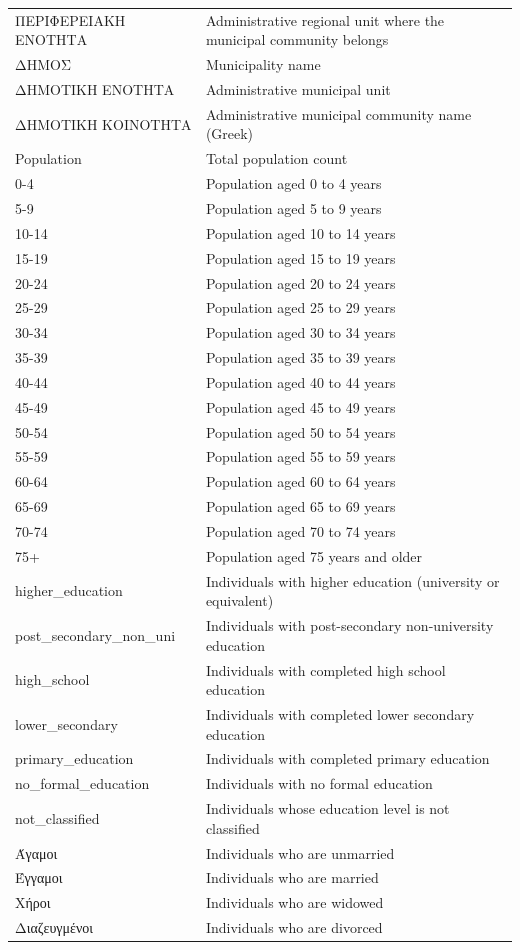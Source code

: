 \begin{longtable}{p{5cm} p{10cm}}
    ΠΕΡΙΦΕΡΕΙΑΚΗ ΕΝΟΤΗΤΑ & Administrative regional unit where the municipal community belongs \\
    ΔΗΜΟΣ & Municipality name \\
    ΔΗΜΟΤΙΚΗ ΕΝΟΤΗΤΑ & Administrative municipal unit \\
    ΔΗΜΟΤΙΚΗ ΚΟΙΝΟΤΗΤΑ & Administrative municipal community name (Greek) \\
    Population & Total population count \\
    0-4 & Population aged 0 to 4 years \\
    5-9 & Population aged 5 to 9 years \\
    10-14 & Population aged 10 to 14 years \\
    15-19 & Population aged 15 to 19 years \\
    20-24 & Population aged 20 to 24 years \\
    25-29 & Population aged 25 to 29 years \\
    30-34 & Population aged 30 to 34 years \\
    35-39 & Population aged 35 to 39 years \\
    40-44 & Population aged 40 to 44 years \\
    45-49 & Population aged 45 to 49 years \\
    50-54 & Population aged 50 to 54 years \\
    55-59 & Population aged 55 to 59 years \\
    60-64 & Population aged 60 to 64 years \\
    65-69 & Population aged 65 to 69 years \\
    70-74 & Population aged 70 to 74 years \\
    75+ & Population aged 75 years and older \\
    higher\_education & Individuals with higher education (university or equivalent) \\
    post\_secondary\_non\_uni & Individuals with post-secondary non-university education \\
    high\_school & Individuals with completed high school education \\
    lower\_secondary & Individuals with completed lower secondary education \\
    primary\_education & Individuals with completed primary education \\
    no\_formal\_education & Individuals with no formal education \\
    not\_classified & Individuals whose education level is not classified \\
    Άγαμοι & Individuals who are unmarried \\
    Έγγαμοι & Individuals who are married \\
    Χήροι & Individuals who are widowed \\
    Διαζευγμένοι & Individuals who are divorced \\
\end{longtable}


